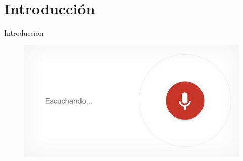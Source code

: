 \section{Introducci\'on}

\begin{frame}{Introducci\'on}

\begin{figure}[H]
\centering
\includegraphics[width=0.7\linewidth]{./graphics/speech_intro.jpg}
\end{figure}


\end{frame}